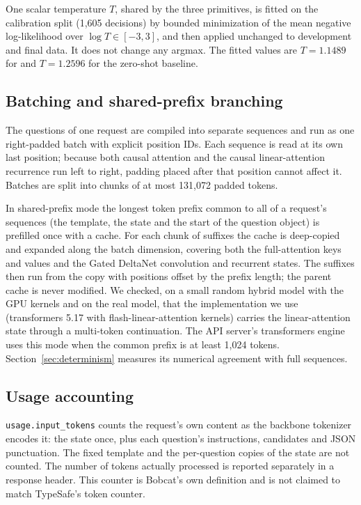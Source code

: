 One scalar temperature $T$, shared by the three primitives, is fitted on the calibration
split (1,605 decisions) by bounded minimization of the mean negative log-likelihood over
$\log T\in[-3,3]$, and then applied unchanged to development and final data. It does not
change any argmax. The fitted values are $T=1.1489$ for \expone{} and $T=1.2596$ for the
zero-shot baseline.

\subsection{Batching and shared-prefix branching}
\label{sec:branching}

The questions of one request are compiled into separate sequences and run as one
right-padded batch with explicit position IDs. Each sequence is read at its own last
position; because both causal attention and the causal linear-attention recurrence run left
to right, padding placed after that position cannot affect it. Batches are split into
chunks of at most 131,072 padded tokens.

In shared-prefix mode the longest token prefix common to all of a request's sequences (the
template, the state and the start of the question object) is prefilled once with a cache.
For each chunk of suffixes the cache is deep-copied and expanded along the batch dimension,
covering both the full-attention keys and values and the Gated DeltaNet convolution and
recurrent states. The suffixes then run from the copy with positions offset by the prefix
length; the parent cache is never modified. We checked, on a small random hybrid model with
the GPU kernels and on the real model, that the implementation we use (transformers 5.17
with flash-linear-attention kernels) carries the linear-attention state through a
multi-token continuation. The API server's transformers engine uses this mode when the common
prefix is at least 1,024 tokens. Section~\ref{sec:determinism} measures its numerical agreement with full
sequences.

\subsection{Usage accounting}
\label{sec:usage}

\texttt{usage.input\_tokens} counts the request's own content as the backbone tokenizer
encodes it: the state once, plus each question's instructions, candidates and JSON
punctuation. The fixed template and the per-question copies of the state are not counted.
The number of tokens actually processed is reported separately in a response header. This
counter is Bobcat's own definition and is not claimed to match TypeSafe's token counter.

